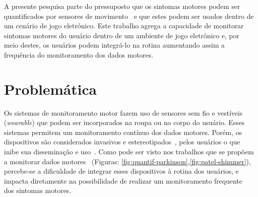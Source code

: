 A presente pesquisa parte do pressuposto que os sintomas motores podem ser quantificados por sensores de movimento~\cite{visionbased2009,patel_monitoring_2009,bachlin_parkinsons_2009} e que estes podem ser usados dentro de um cenário de jogo eletrônico. Este trabalho agrega a capacidade de monitorar sintomas motores do usuário dentro de um ambiente de jogo eletrônico e, por meio destes, os usuários podem integrá-lo na rotina aumentando assim a frequência do monitoramento dos dados motores.


\section{Problemática}\label{section:problematica}
%

Os sistemas de monitoramento motor fazem uso de sensores sem fio e vestíveis (\textit{wearable}) que podem ser incorporados na roupa ou no corpo do usuário. Esses sistemas permitem um monitoramento contínuo dos dados motores. Porém, os dispositivos são considerados invasivos e estereotipados~\cite{aarh10}, pelos usuários o que inibe sua disseminação e uso~\cite{alemdar}. Como pode ser visto nos trabalhos que se propõem a monitorar dados motores~\cite{LeMoyne2009,patel_monitoring_2009} (Figuras: \ref{fig:quantif-parkinson},\ref{fig:patel-shimmer}), percebe-se a dificuldade de integrar esses dispositivos à rotina dos usuários, e impacta diretamente na possibilidade de realizar um monitoramento frequente dos sintomas motores.

